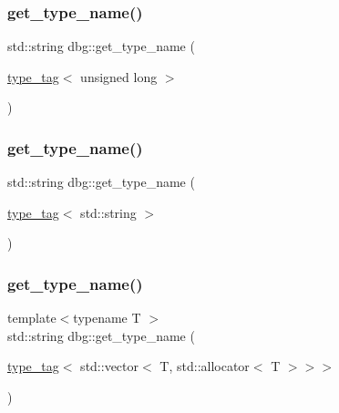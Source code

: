 \mbox{\label{namespacedbg_a5316d9f58e72c20cfbb14496326d89f1}} 
\subsubsection{\texorpdfstring{get\+\_\+type\+\_\+name()}{get\_type\_name()}\hspace{0.1cm}{\footnotesize\ttfamily [5/10]}}
{\footnotesize\ttfamily std\+::string dbg\+::get\+\_\+type\+\_\+name (\begin{DoxyParamCaption}\item[{\hyperlink{structdbg_1_1type__tag}{type\+\_\+tag}$<$ unsigned long $>$}]{ }\end{DoxyParamCaption})\hspace{0.3cm}{\ttfamily [inline]}}

\mbox{\label{namespacedbg_a3bcf58cf4aba1da7a34e79b0fb2ce036}} 
\subsubsection{\texorpdfstring{get\+\_\+type\+\_\+name()}{get\_type\_name()}\hspace{0.1cm}{\footnotesize\ttfamily [6/10]}}
{\footnotesize\ttfamily std\+::string dbg\+::get\+\_\+type\+\_\+name (\begin{DoxyParamCaption}\item[{\hyperlink{structdbg_1_1type__tag}{type\+\_\+tag}$<$ std\+::string $>$}]{ }\end{DoxyParamCaption})\hspace{0.3cm}{\ttfamily [inline]}}

\mbox{\label{namespacedbg_a09680fe23089b62fd2879bd1f38897a6}} 
\subsubsection{\texorpdfstring{get\+\_\+type\+\_\+name()}{get\_type\_name()}\hspace{0.1cm}{\footnotesize\ttfamily [7/10]}}
{\footnotesize\ttfamily template$<$typename T $>$ \\
std\+::string dbg\+::get\+\_\+type\+\_\+name (\begin{DoxyParamCaption}\item[{\hyperlink{structdbg_1_1type__tag}{type\+\_\+tag}$<$ std\+::vector$<$ T, std\+::allocator$<$ T $>$$>$$>$}]{ }\end{DoxyParamCaption})}

